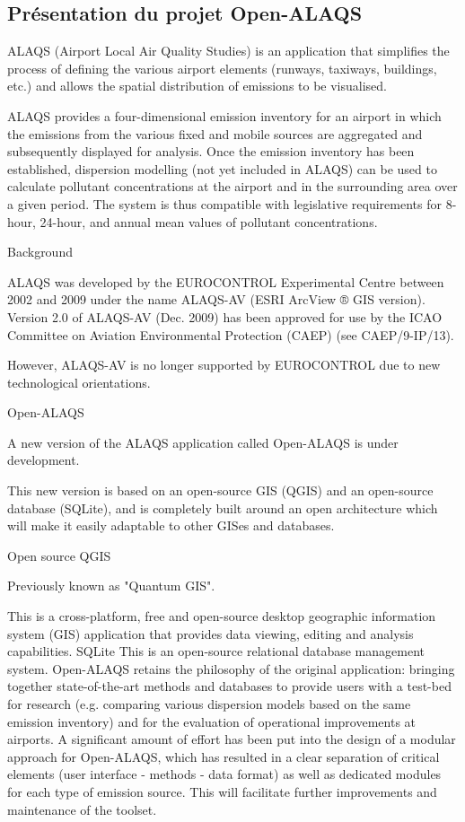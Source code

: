 \documentclass[a4paper]{article}
\begin{document}
    \subsection{Présentation du projet Open-ALAQS}
    ALAQS (Airport Local Air Quality Studies) is an application that simplifies the process of defining the various airport elements (runways, taxiways, buildings, etc.) and allows the spatial distribution of emissions to be visualised.
    
    ALAQS provides a four-dimensional emission inventory for an airport in which the emissions from the various fixed and mobile sources are aggregated and subsequently displayed for analysis. Once the emission inventory has been established, dispersion modelling (not yet included in ALAQS) can be used to calculate pollutant concentrations at the airport and in the surrounding area over a given period. The system is thus compatible with legislative requirements for 8-hour, 24-hour, and annual mean values of pollutant concentrations.
    
    Background
    
    ALAQS was developed by the EUROCONTROL Experimental Centre between 2002 and 2009 under the name ALAQS-AV (ESRI ArcView ® GIS version). Version 2.0 of ALAQS-AV (Dec. 2009) has been approved for use by the ICAO Committee on Aviation Environmental Protection (CAEP) (see CAEP/9-IP/13).
    
    However, ALAQS-AV is no longer supported by EUROCONTROL due to new technological orientations.
    
    
    Open-ALAQS
    
    A new version of the ALAQS application called Open-ALAQS is under development.
    
    This new version is based on an open-source GIS (QGIS) and an open-source database (SQLite), and is completely built around an open architecture which will make it easily adaptable to other GISes and databases.
    
    Open source
    QGIS
    
    Previously known as "Quantum GIS".
    
    This is a cross-platform, free and open-source desktop geographic information system (GIS) application that provides data viewing, editing and analysis capabilities.
    SQLite	This is an open-source relational database management system.
    Open-ALAQS retains the philosophy of the original application: bringing together state-of-the-art methods and databases to provide users with a test-bed for research (e.g. comparing various dispersion models based on the same emission inventory) and for the evaluation of operational improvements at airports. A significant amount of effort has been put into the design of a modular approach for Open-ALAQS, which has resulted in a clear separation of critical elements (user interface - methods - data format) as well as dedicated modules for each type of emission source. This will facilitate further improvements and maintenance of the toolset.
    
\end{document}
